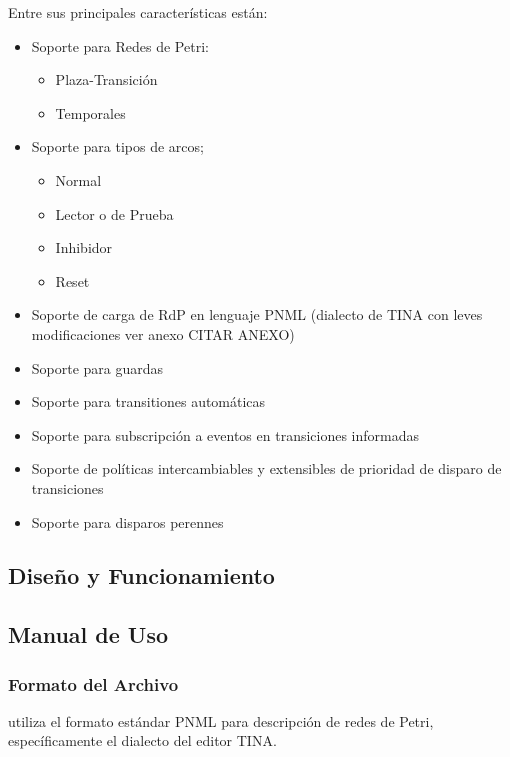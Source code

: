 Entre sus principales características están:
\begin{itemize}
  \item Soporte para Redes de Petri:
  \begin{itemize}
    \item Plaza-Transición
    \item Temporales
  \end{itemize}
  
  \item Soporte para tipos de arcos;
  \begin{itemize}
    \item Normal
    \item Lector o de Prueba
    \item Inhibidor
    \item Reset
  \end{itemize}
  
  \item Soporte de carga de RdP en lenguaje PNML (dialecto de TINA con leves
  modificaciones {\color{red} ver anexo CITAR ANEXO})
  \item Soporte para guardas
  \item Soporte para transitiones automáticas
  \item Soporte para subscripción a eventos en transiciones informadas
  \item Soporte de políticas intercambiables y extensibles de prioridad de
  disparo de transiciones
  \item Soporte para disparos perennes

\end{itemize}

\subsection{Diseño y Funcionamiento}

\subsection{Manual de Uso}

\subsubsection{Formato del Archivo}

\javapetriconcurrencymonitor utiliza el formato estándar PNML para descripción
de redes de Petri, específicamente el dialecto del editor TINA.\cite{TinaSite}

